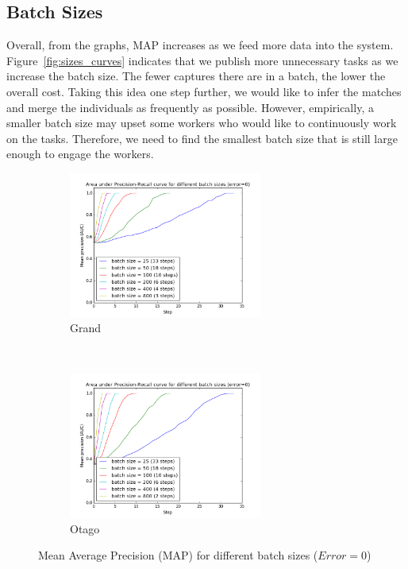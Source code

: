 \subsection{Batch Sizes} %
\label{sub:batch_sizes_res}

Overall, from the graphs, MAP increases as we feed more data into the system.
Figure~\ref{fig:sizes_curves} indicates that we publish more unnecessary
tasks as we increase the batch size. The fewer captures there are in a batch,
the lower the overall cost. Taking this idea one step further, we would like to
infer the matches and merge the individuals as frequently as possible. However,
empirically, a smaller batch size may upset some workers who would like to
continuously work on the tasks. Therefore, we need to find the smallest batch
size that is still large enough to engage the workers.

\begin{figure}[htbp]
  \centering
  \begin{subfigure}[t]{\textwidth}
      \centering
      \includegraphics[width=0.7\textwidth]{sizes/graoc}
      \caption{Grand}
  \end{subfigure}%
  ~ \\
    \begin{subfigure}[t]{\textwidth}
      \centering
      \includegraphics[width=0.7\textwidth]{sizes/otaoc}
      \caption{Otago}
  \end{subfigure}%
  \captionsetup{justification=centering}
  \caption{Mean Average Precision (MAP) for different batch sizes ($Error=0$)}
\end{figure}

